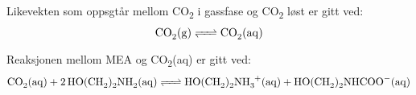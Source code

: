 Likevekten som oppsgtår mellom CO\textsubscript{2} i gassfase og CO\textsubscript{2} løst er gitt ved: 
\begin{equation}
    \ce{CO_{2}(g) <=> CO_{2}(aq)}
    \label{CO2}
\end{equation}

Reaksjonen mellom MEA og CO\textsubscript{2}(aq) er gitt ved:
\begin{equation}
    \ce{CO_{2}(aq) + 2HO(CH_{2})_{2}NH_{2}(aq) <=> HO(CH_{2})_{2}NH_{3}^{+}(aq) + HO(CH_{2})_{2}NHCOO^{-}(aq)}
    \label{MEA_CO2}
\end{equation}
